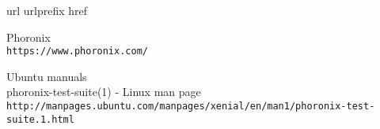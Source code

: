 \begin{thebibliography}{10}
\expandafter\ifx\csname url\endcsname\relax
  \def\url#1{\texttt{#1}}\fi
\expandafter\ifx\csname urlprefix\endcsname\relax\def\urlprefix{URL }\fi
\expandafter\ifx\csname href\endcsname\relax
  \def\href#1#2{#2} \def\path#1{#1}\fi

Phoronix\\
  \url{https://www.phoronix.com/}

Ubuntu manuals\\
phoronix-test-suite(1) - Linux man page\\
  \url{http://manpages.ubuntu.com/manpages/xenial/en/man1/phoronix-test-suite.1.html}

\end{thebibliography}

